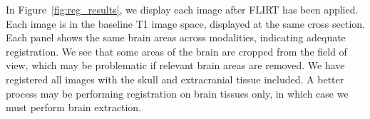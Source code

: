 In Figure~\ref{fig:reg_results}, we display each image after FLIRT has been applied.  Each image is in the baseline T1 image space, displayed at the same cross section.  Each panel shows the same brain areas across modalities, indicating adequate registration.  We see that some areas of the brain are cropped from the field of view, which may be problematic if relevant brain areas are removed.  We have registered all images with the skull and extracranial tissue included.  A better process may be performing registration on brain tissues only, in which case we must perform brain extraction.

\begin{figure}
   \hspace*{-0.9em}
\hfill
\hfill
\hfill
\end{figure}
